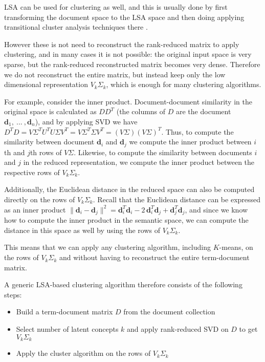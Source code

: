 LSA can be used for clustering as well, and this is usually done 
by first transforming the document space to the LSA space
and then doing applying transitional cluster analysis techniques
there \cite{schutze1997projections}. 

However these is not need to reconstruct the rank-reduced matrix 
to apply clustering, and in many cases it is not possible: 
the original input space is very sparse, but the rank-reduced 
reconstructed matrix becomes very dense. Therefore we do not 
reconstruct the entire matrix, but instead keep only the low 
dimensional representation $V_k \Sigma_k$, which is enough 
for many clustering algorithms.

For example, consider the inner product. Document-document similarity 
in the original space is calculated as $D D^T$ (the columns of $D$ 
are the document $\mathbf d_1, \ ... \ , \mathbf d_n$), and by applying 
SVD we have $D^T D = V \Sigma^T U^T U \Sigma V^T = V \Sigma^T \Sigma V^T = 
(V \Sigma) (V \Sigma)^T$. Thus, to compute the similarity between
document $\mathbf d_i$ and $\mathbf d_j$ we compute the inner product 
between $i$th and $j$th rows of $V \Sigma$. Likewise, to compute 
the similarity between documents $i$ and $j$ in the reduced representation,
we compute the inner product between the respective rows of $V_k \Sigma_k$.

Additionally, the Euclidean distance in the reduced space can also be computed 
directly on the rows of $V_k \Sigma_k$. Recall that the Euclidean distance can
be expressed as an inner product
$\| \mathbf d_i - \mathbf d_j \|^2 = \mathbf d_i^T \mathbf d_i - 2 \, \mathbf d_i^T \mathbf d_j + \mathbf d_j^T \mathbf d_j$, and since we know how to compute the inner product 
in the semantic space, we can compute the distance in this space as well
by using the rows of $V_k \Sigma_k$.

This means that we can apply any clustering algorithm,
including $K$-means, on the rows of $V_k \Sigma_k$ and without having
to reconstruct the entire term-document matrix. 

A generic LSA-based clustering algorithm therefore consists of the following steps:

\begin{itemize}
\itemsep1pt\parskip0pt
  \item Build a term-document matrix $D$ from the document collection
  \item Select number of latent concepts $k$ and apply rank-reduced SVD on $D$ to get $V_k \Sigma_k$
  \item Apply the cluster algorithm on the rows of $V_k \Sigma_k$
\end{itemize}


